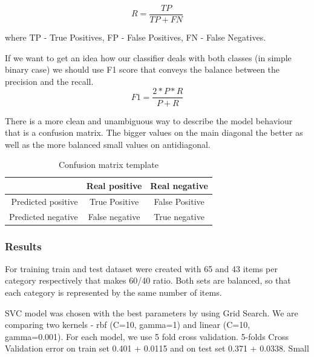 \documentclass[11pt]{article}
\begin{document}
\begin{equation}
R = \frac{TP}{TP+FN}
\end{equation}

where TP - True Positives, FP - False Positives, FN - False Negatives.

If we want to get an idea how our classifier deals with both classes (in simple binary case) we should use F1 score that conveys the balance between the precision and the recall.
\begin{equation}
F1 = \frac{2*P*R}{P+R}
\end{equation}

    There is a more clean and unambiguous way to describe the model behaviour that is a confusion matrix. The bigger values on the main diagonal the better as well as the more balanced small values on antidiagonal.

\begin{table}[htb]
\begin{center}
\begin{tabular}{ |r|c|c| }
\hline
& Real positive & Real negative \\ \hline
Predicted positive & True Positive 	& False Positive \\ \hline
Predicted negative & False negative & True negative \\ \hline
\end{tabular}
\caption{Confusion matrix template}
\end{center}
\end{table}
\FloatBarrier

\subsubsection{Results}

For training train and test dataset were created with 65 and 43 items per category respectively that makes 60/40 ratio. Both sets are balanced, so that each category is represented by the same number of items. 

SVC model was chosen with the best parameters by using Grid Search. We are comparing two kernels - rbf (C=10, gamma=1) and linear (C=10, gamma=0.001). For each model, we use 5 fold cross validation.
5-folds Cross Validation error on train set 0.401 + 0.0115 and on test set 0.371 + 0.0338. Small %
\end{document}
